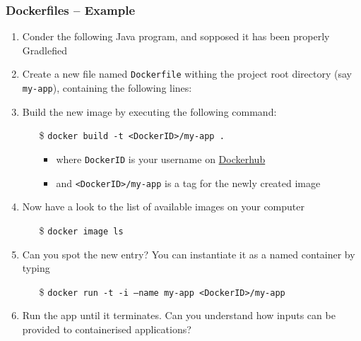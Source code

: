 \documentclass{beamer}\mode<presentation>{\usetheme{AMSBolognaFC}}
\begin{document}
\begin{frame}[allowframebreaks]
\frametitle{Dockerfiles -- Example}

    \begin{enumerate}
        \item Conder the following Java program, and sopposed it has been properly Gradlefied
        

        \framebreak

        \item Create a new file named \alert{\texttt{Dockerfile}} withing the project root directory (say \alert{\texttt{my-app}}), containing the following lines:
        

        \framebreak

        \item Build the new image by executing the following command:
        \begin{itemize}
            \item[\$] \texttt{docker \alert{build} -t <DockerID>/my-app \alert{.}}
            \begin{itemize}
                \item where \texttt{DockerID} is your username on \href{https://hub.docker.com/}{Dockerhub}
                \item and \alert{\texttt{<DockerID>/my-app}} is a \alert{tag} for the newly created image
            \end{itemize}
        \end{itemize}

        \item Now have a look to the list of available images on your computer
        \begin{itemize}
            \item[\$] \texttt{docker image ls}
        \end{itemize}

        \item Can you spot the new entry? You can instantiate it as a \alert{named} container by typing
        \begin{itemize}
            \item[\$] \texttt{docker run -t -i \alert{--name my-app} <DockerID>/my-app}
        \end{itemize}

        \item Run the app until it terminates. Can you understand how inputs can be provided to containerised applications?


\end{enumerate}
\end{frame}
\end{document}
